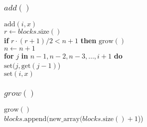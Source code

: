 \documentclass{beamer}
\begin{document}
\begin{frame}
\frametitle{$add()$}
\begin{oframed}
\begin{flushleft}
\hspace*{1em} \ensuremath{\mathrm{add}(\ensuremath{\mathit{i}}, \ensuremath{\mathit{x}})}\\

\hspace*{1em} \hspace*{1em} \ensuremath{\ensuremath{\mathit{r}} \gets  \ensuremath{\ensuremath{\mathit{blocks}}.\mathrm{size}()}}\\
\hspace*{1em} \hspace*{1em} {\color{black} \textbf{if}} \ensuremath{\ensuremath{\mathit{r}}\cdot (\ensuremath{\mathit{r}}+1)/2 < \ensuremath{\mathit{n}} + 1} {\color{black} \textbf{then}}  \ensuremath{\mathrm{grow}()}\\
\hspace*{1em} \hspace*{1em} \ensuremath{\ensuremath{\mathit{n}} \gets  \ensuremath{\ensuremath{\mathit{n}} + 1}}\\
\hspace*{1em} \hspace*{1em} {\color{black} \textbf{for}} \ensuremath{j} {\color{black} \textbf{in}} \ensuremath{\ensuremath{\mathit{n}}-1,\ensuremath{\mathit{n}}-2,\ensuremath{\mathit{n}}-3,\ldots,\ensuremath{\mathit{i}}+1} {\color{black} \textbf{do}} \\
\hspace*{1em} \hspace*{1em} \hspace*{1em} \ensuremath{\mathrm{set}(\ensuremath{\mathit{j}}, \mathrm{get}(\ensuremath{\mathit{j}}-1)})\\
\hspace*{1em} \hspace*{1em} \ensuremath{\mathrm{set}(\ensuremath{\mathit{i}}, \ensuremath{\mathit{x}})}\\
\end{flushleft}
\end{oframed}
\end{frame}
\begin{frame}
\frametitle{$grow()$}
\begin{oframed}
\begin{flushleft}
\hspace*{1em} \ensuremath{\mathrm{grow}()}\\
\hspace*{1em} \hspace*{1em} \ensuremath{\ensuremath{\mathit{blocks}}.\mathrm{append}(\mathrm{new\_array}(\ensuremath{\mathit{blocks}}.\mathrm{size}()+1}))\\
\end{flushleft}
\end{oframed}
\end{frame}
\end{document}
